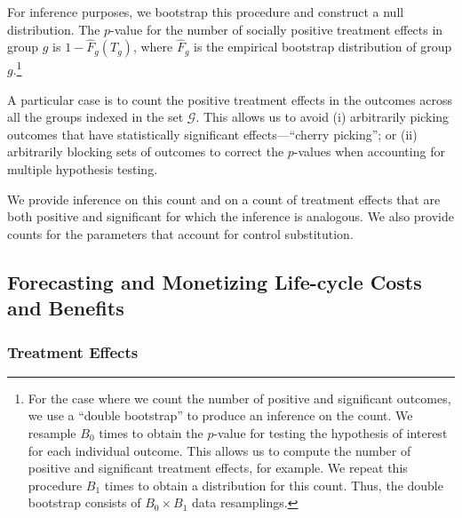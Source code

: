For inference purposes, we bootstrap this procedure and construct a null distribution. The $p$-value for the number of socially positive treatment effects in group $g$ is $1 - \widehat{F}_{g} \left( T_{g} \right)$, where $ \widehat{F}_{g}$ is the empirical bootstrap distribution of group $g$.\footnote{For the case where we count the number of positive and significant outcomes, we use a ``double bootstrap'' to produce an inference on the count. We resample $B_{0}$ times to obtain the $p$-value for testing the hypothesis of interest for each individual outcome. This allows us to compute the number of positive and significant treatment effects, for example. We repeat this procedure $B_{1}$ times to obtain a distribution for this count. Thus, the double bootstrap consists of $B_{0} \times B_{1}$ data resamplings.}

A particular case is to count the positive treatment effects in the outcomes across all the groups indexed in the set $\mathcal{G}$. This allows us to avoid (i) arbitrarily picking outcomes that have statistically significant effects---``cherry picking''; or (ii) arbitrarily blocking sets of outcomes to correct the $p$-values when accounting for multiple hypothesis testing.

We provide inference on this count and on a count of treatment effects that are both positive and significant for which the inference is analogous. We also provide counts for the parameters that account for control substitution.

\subsection{Forecasting and Monetizing Life-cycle Costs and Benefits} \label{section:cbamethodology}

\subsubsection{Treatment Effects} \label{section:teresults}


